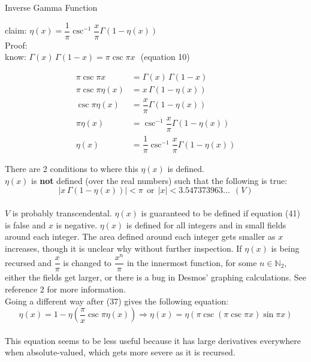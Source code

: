 \documentclass[12pt]{article}
\begin{document}
\pagebreak\begin{section}{Inverse Gamma Function}
	
	claim: $\eta(x)=\dfrac1\pi\csc^{-1}\dfrac x\pi\Gamma(1-\eta(x))$\\
	Proof:\\
	know: $\Gamma(x)\,\Gamma(1-x)=\pi\csc\pi x~~~$(equation 10)

	\begin{align} %
		\pi\csc\pi x & =\Gamma(x)\,\Gamma(1-x)\\
		\pi\csc\pi\eta(x) & =x\,\Gamma(1-\eta(x))\\
		\csc\pi\eta(x) & =\dfrac x\pi\Gamma(1-\eta(x))\\
		\pi\eta(x) & =\csc^{-1}\dfrac x\pi\Gamma(1-\eta(x))\\
		\eta(x) & =\dfrac1\pi\csc^{-1}\dfrac x\pi\Gamma(1-\eta(x))
	\end{align}

	\noindent\blacksquare

	\noindent There are 2 conditions to where this $\eta(x)$ is defined.\\
	$\eta(x)$ is \textbf{not} defined (over the real numbers) such that the following is true:\\
	\begin{equation}
		|x\,\Gamma(1-\eta(x))|<\pi~~\text{or}~~|x|<3.547373963...~~(V)
	\end{equation}\\ %
	$V$ is probably transcendental. $\eta(x)$ is guaranteed to be defined if equation (41) is false and $x$ is negative. $\eta(x)$ is defined for all integers and in small fields around each integer. The area defined around each integer gets smaller as $x$ increases, though it is unclear why without further inspection. If $\eta(x)$ is being recursed and $\dfrac x\pi$ is changed to $\dfrac{x^n}\pi$ in the innermost function, for some $n\in\mathbb N_2$, either the fields get larger, or there is a bug in Desmos' graphing calculations. See reference 2 for more information.\\
	Going a different way after (37) gives the following equation:\\
	\begin{equation}
		\eta(x)=1-\eta\left(\dfrac\pi x\csc\pi\eta(x)\right)\Longrightarrow\eta(x)=\eta(\pi\csc(\pi\csc\pi x)\sin\pi x)
	\end{equation}\\ %
	This equation seems to be less useful because it has large derivatives everywhere when absolute-valued, which gets more severe as it is recursed.
\end{section}
\end{document}
